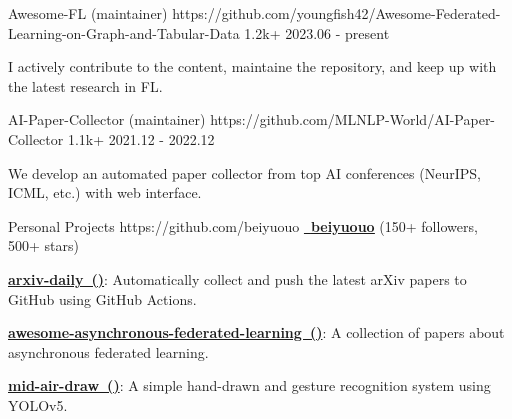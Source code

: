 \begin{cventries}

\cvproject
{Awesome-FL (maintainer)} %
{https://github.com/youngfish42/Awesome-Federated-Learning-on-Graph-and-Tabular-Data}
{1.2k+} %
{2023.06 - present} %
{
\begin{cvitems} %
\item {I actively contribute to the content, maintaine the repository, and keep up with the latest research in FL. }
\end{cvitems}
} %



\cvproject
{AI-Paper-Collector (maintainer)} %
{https://github.com/MLNLP-World/AI-Paper-Collector}
{1.1k+} %
{2021.12 - 2022.12} %
{
\begin{cvitems} %
\item {We develop an automated paper collector from top AI conferences (NeurIPS, ICML, etc.) with web interface.}
\end{cvitems}
} %


\cvproject
{Personal Projects} %
{https://github.com/beiyuouo} %
{} %
{\href{https://github.com/beiyuouo}{\textcolor{text}{\faGithub~\textbf{\underline{beiyuouo}}}} (150+ followers, 500+ stars)} %
{
\begin{cvitems} %
\item {\href{https://github.com/beiyuouo/arxiv-daily}{\textbf{arxiv-daily~()}}: Automatically collect and push the latest arXiv papers to GitHub using GitHub Actions.}
\item {\href{https://github.com/beiyuouo/awesome-asynchronous-federated-learning}{\textbf{awesome-asynchronous-federated-learning~()}}: A collection of papers about asynchronous federated learning.}
\item {\href{https://github.com/beiyuouo/mid-air-draw}{\textbf{mid-air-draw~()}}: A simple hand-drawn and gesture recognition system using YOLOv5.}
\end{cvitems}
} %


\end{cventries}
